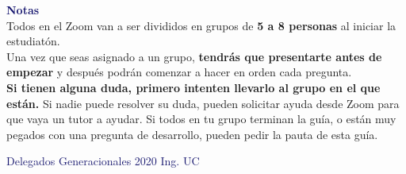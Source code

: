 \begin{coverpages}
\begin{flushleft}
        \vfill

        \textcolor{MidnightBlue}{\textbf{\large Notas}}\\

        Todos en el Zoom van a ser divididos en grupos de \textbf{5 a 8 personas} al iniciar la estudiatón.\\ Una vez que seas asignado a un grupo, \textbf{tendrás que presentarte antes de empezar} y después podrán comenzar a hacer en orden cada pregunta.\\[\baselineskip]

        \textbf{Si tienen alguna duda, primero intenten llevarlo al grupo en el que están.} Si nadie puede resolver su duda, pueden solicitar ayuda desde Zoom para que vaya un tutor a ayudar. Si todos en tu grupo terminan la guía, o están muy pegados con una pregunta de desarrollo, pueden pedir la pauta de esta guía.

        \vspace{3mm} \textcolor{MidnightBlue}{\small Delegados Generacionales 2020 Ing. UC}
    \end{flushleft}
\end{coverpages}
\newpage

{\printanswers}{}